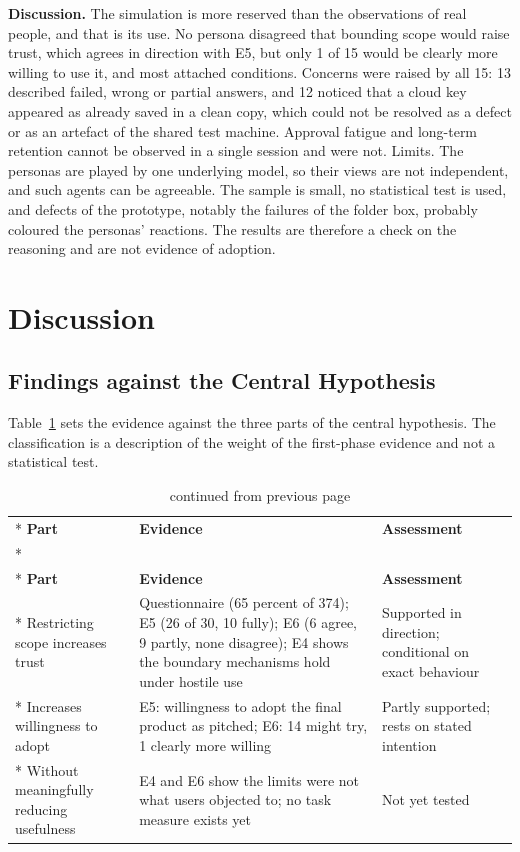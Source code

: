 \documentclass{FastFyp}
\begin{document}
\textbf{Discussion.} The simulation is more reserved than the observations of real people, and that is its use. No persona disagreed that bounding scope would raise trust, which agrees in direction with E5, but only 1 of 15 would be clearly more willing to use it, and most attached conditions. Concerns were raised by all 15: 13 described failed, wrong or partial answers, and 12 noticed that a cloud key appeared as already saved in a clean copy, which could not be resolved as a defect or as an artefact of the shared test machine. Approval fatigue and long-term retention cannot be observed in a single session and were not. Limits. The personas are played by one underlying model, so their views are not independent, and such agents can be agreeable. The sample is small, no statistical test is used, and defects of the prototype, notably the failures of the folder box, probably coloured the personas' reactions. The results are therefore a check on the reasoning and are not evidence of adoption.

\section{Discussion}
\subsection{Findings against the Central Hypothesis}
Table~\ref{tab:hyp} sets the evidence against the three parts of the central hypothesis. The classification is a description of the weight of the first-phase evidence and not a statistical test.

{
\begin{longtable}{|p{3.0cm}|p{7.2cm}|p{2.9cm}|}
\caption{Assessment of the central hypothesis.}\label{tab:hyp}\\*
\hline
\textbf{Part} & \textbf{Evidence} & \textbf{Assessment} \\*
\hline
\endfirsthead
\caption[]{continued from previous page}\\*
\hline
\textbf{Part} & \textbf{Evidence} & \textbf{Assessment} \\*
\hline
\endhead
\hline
Restricting scope increases trust & Questionnaire (65 percent of 374); E5 (26 of 30, 10 fully); E6 (6 agree, 9 partly, none disagree); E4 shows the boundary mechanisms hold under hostile use & Supported in direction; conditional on exact behaviour \\*
\hline
Increases willingness to adopt & E5: willingness to adopt the final product as pitched; E6: 14 might try, 1 clearly more willing & Partly supported; rests on stated intention \\*
\hline
Without meaningfully reducing usefulness & E4 and E6 show the limits were not what users objected to; no task measure exists yet & Not yet tested \\
\hline
\end{longtable}
}
\end{document}
